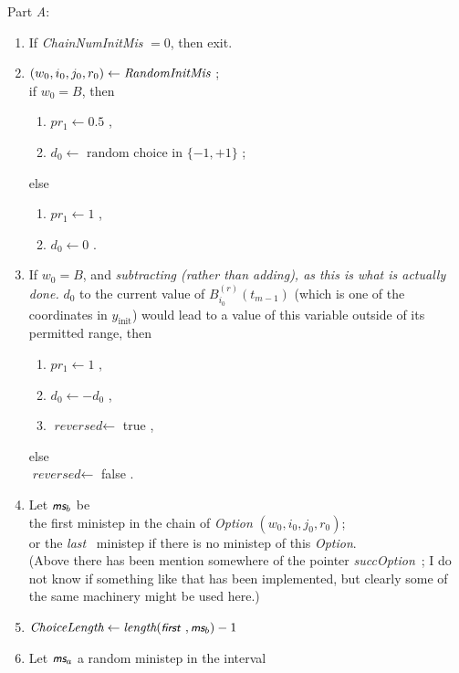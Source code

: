\documentclass[a4paper,12pt,fleqn]{article}
\newcommand{\nnm}[1]{\textsf{\small\textit{#1}\ }}
\newcommand{\ms}{\textsl{\textsf{\small ms}}} %
\begin{document}
Part \emph{A}:
\begin{enumerate}
\item If \textit{ChainNumInitMis} $ = 0$, then exit.
\item  $ (w_0,i_0,j_0,r_0)  \leftarrow  \emph{RandomInitMis}$ ; \\
      if $ w_0 = B$, then
        \begin{enumerate}
        \item     $ pr_1   \leftarrow  0.5$ ,
        \item $  d_0   \leftarrow \text{ random choice in } \{-1, +1\}  $ ;
        \end{enumerate}
        else
        \begin{enumerate}
        \item     $ pr_1   \leftarrow  1 $ ,
        \item $  d_0   \leftarrow 0 $ .
        \end{enumerate}
\item   If $w_0 = B$, and \emph{subtracting (rather than adding), as this is
    what is actually done.} $d_0$ to
        the current value of $B^{(r)}_{i_0}(t_{m-1})$
        (which is one of the coordinates in $y_{\text{init}}$)
         would lead to a value of this variable outside of its
         permitted range, then
        \begin{enumerate}
        \item     $ pr_1   \leftarrow  1 $ ,
        \item $  d_0   \leftarrow -d_0 $ ,
        \item $ \textit{reversed} \leftarrow $ true  ,
        \end{enumerate}
        else\\
        $ \textit{reversed} \leftarrow $ false .
\item Let $\ms_b$ be \\
      the first ministep in the chain
      of \textit{Option} $(w_0,i_0,j_0,r_0)$; \\
      or the \nnm{last} ministep
      if there is no ministep of this \textit{Option}.\\
      (Above there has been mention somewhere of the pointer \nnm{succOption};
      I do not know if something like that has been implemented,
      but clearly some of the same machinery might be used here.)
\item $\textit{ChoiceLength} \leftarrow \textit{length}(\nnm{first}, \ms_b ) - 1$
\item Let $\ms_a$ a random ministep in the interval

\end{enumerate}
\end{document}
